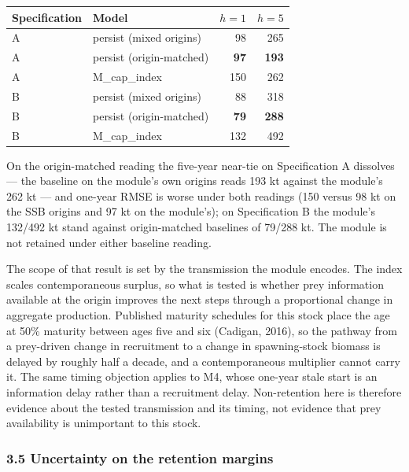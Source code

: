 \documentclass[11pt]{article}
\begin{document}
\begin{longtable}[]{@{}llrr@{}}
\toprule\noalign{}
Specification & Model & \(h=1\) & \(h=5\) \\
\midrule\noalign{}
\endhead
\bottomrule\noalign{}
\endlastfoot
A & persist (mixed origins) & 98 & 265 \\
A & persist (origin-matched) & \textbf{97} & \textbf{193} \\
A & M\_cap\_index & 150 & 262 \\
B & persist (mixed origins) & 88 & 318 \\
B & persist (origin-matched) & \textbf{79} & \textbf{288} \\
B & M\_cap\_index & 132 & 492 \\
\end{longtable}

On the origin-matched reading the five-year near-tie on Specification A
dissolves --- the baseline on the module's own origins reads 193 kt
against the module's 262 kt --- and one-year RMSE is worse under both
readings (150 versus 98 kt on the SSB origins and 97 kt on the
module's); on Specification B the module's 132/492 kt stand against
origin-matched baselines of 79/288 kt. The module is not retained under
either baseline reading.

The scope of that result is set by the transmission the module encodes.
The index scales contemporaneous surplus, so what is tested is whether
prey information available at the origin improves the next steps through
a proportional change in aggregate production. Published maturity
schedules for this stock place the age at 50\% maturity between ages
five and six (Cadigan, 2016), so the pathway from a prey-driven change in
recruitment to a change in spawning-stock biomass is delayed by roughly
half a decade, and a contemporaneous multiplier cannot carry it. The same
timing objection applies to M4, whose one-year stale start is an
information delay rather than a recruitment delay. Non-retention here is
therefore evidence about the tested transmission and its timing, not
evidence that prey availability is unimportant to this stock.

\subsubsection{3.5 Uncertainty on the retention
margins}\label{uncertainty-on-the-retention-margins}
\end{document}
